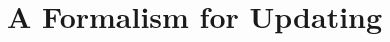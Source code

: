 \documentclass{article}
\begin{document}
% 



\section{A Formalism for Updating}
\def\X{\mathcal X}
\def\W{\mathcal W}
\end{document}
